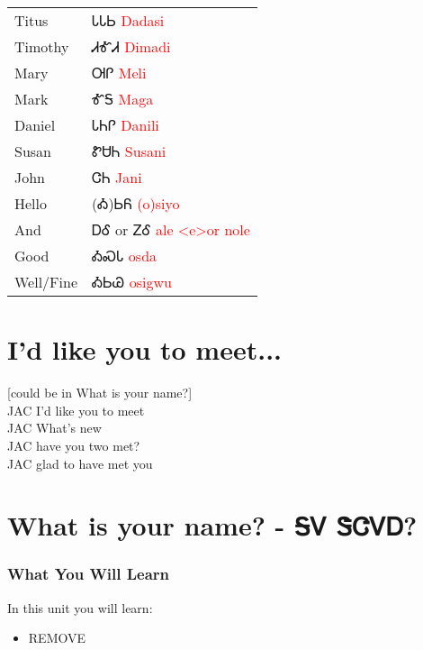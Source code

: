 \begin{minipage}{\linewidth}
\begin{tabular}{p{3cm} p{11cm}}
Titus & ᏓᏓᏏ 
 \newline \textcolor{red}{Dadasi}\\
Timothy & ᏗᎹᏗ 
 \newline \textcolor{red}{Dimadi}\\
Mary & ᎺᎵ 
 \newline \textcolor{red}{Meli}\\
Mark & ᎹᎦ 
 \newline \textcolor{red}{Maga}\\
Daniel & ᏓᏂᎵ 
 \newline \textcolor{red}{Danili}\\
Susan & ᏑᏌᏂ 
 \newline \textcolor{red}{Susani}\\
John & ᏣᏂ 
 \newline \textcolor{red}{Jani}\\
Hello & (Ꭳ)ᏏᏲ 
 \newline \textcolor{red}{(o)siyo}\\
And & ᎠᎴ 
  or ᏃᎴ 
 \newline \textcolor{red}{ale <e>or nole}\\
Good & ᎣᏍᏓ 
 \newline \textcolor{red}{osda}\\
Well/Fine & ᎣᏏᏊ 
 \newline \textcolor{red}{osigwu}\\
\end{tabular}
\end{minipage}

\chapter{I'd like you to meet...}
[could be in What is your name?]\\JAC I'd like you to meet\\JAC What's new\\JAC have you two met?\\JAC glad to have met you\\
\chapter{What is your name? - ᎦᏙ ᏕᏣᏙᎠ?}
\subsection{What You Will Learn}
In this unit you will learn:
\begin{itemize}
\item REMOVE
\end{itemize}\newpage

